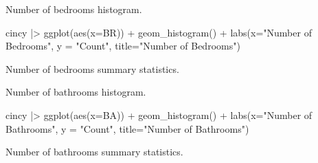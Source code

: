 \documentclass[
  letterpaper,
  DIV=11,
  numbers=noendperiod]{scrartcl}
\newenvironment{Shaded}{\begin{snugshade}}{\end{snugshade}}
\newcommand{\AttributeTok}[1]{\textcolor[rgb]{0.40,0.45,0.13}{#1}}
\newcommand{\ConstantTok}[1]{\textcolor[rgb]{0.56,0.35,0.01}{#1}}
\newcommand{\DecValTok}[1]{\textcolor[rgb]{0.68,0.00,0.00}{#1}}
\newcommand{\FunctionTok}[1]{\textcolor[rgb]{0.28,0.35,0.67}{#1}}
\newcommand{\NormalTok}[1]{\textcolor[rgb]{0.00,0.23,0.31}{#1}}
\newcommand{\SpecialCharTok}[1]{\textcolor[rgb]{0.37,0.37,0.37}{#1}}
\newcommand{\StringTok}[1]{\textcolor[rgb]{0.13,0.47,0.30}{#1}}
\begin{document}
Number of bedrooms histogram.

\begin{Shaded}
\begin{Highlighting}[]
\NormalTok{cincy }\SpecialCharTok{|\textgreater{}} \FunctionTok{ggplot}\NormalTok{(}\FunctionTok{aes}\NormalTok{(}\AttributeTok{x=}\NormalTok{BR)) }\SpecialCharTok{+} \FunctionTok{geom\_histogram}\NormalTok{() }\SpecialCharTok{+} 
  \FunctionTok{labs}\NormalTok{(}\AttributeTok{x=}\StringTok{"Number of Bedrooms"}\NormalTok{, }\AttributeTok{y =} \StringTok{"Count"}\NormalTok{, }\AttributeTok{title=}\StringTok{"Number of Bedrooms"}\NormalTok{)}
\end{Highlighting}
\end{Shaded}

Number of bedrooms summary statistics.

\begin{Shaded}
\end{Shaded}

Number of bathrooms histogram.

\begin{Shaded}
\begin{Highlighting}[]
\NormalTok{cincy }\SpecialCharTok{|\textgreater{}} \FunctionTok{ggplot}\NormalTok{(}\FunctionTok{aes}\NormalTok{(}\AttributeTok{x=}\NormalTok{BA)) }\SpecialCharTok{+} \FunctionTok{geom\_histogram}\NormalTok{() }\SpecialCharTok{+} 
  \FunctionTok{labs}\NormalTok{(}\AttributeTok{x=}\StringTok{"Number of Bathrooms"}\NormalTok{, }\AttributeTok{y =} \StringTok{"Count"}\NormalTok{, }\AttributeTok{title=}\StringTok{"Number of Bathrooms"}\NormalTok{)}
\end{Highlighting}
\end{Shaded}

Number of bathrooms summary statistics.
\end{document}
